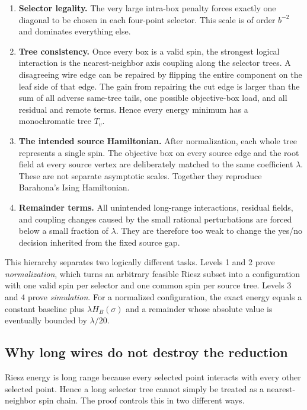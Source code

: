 \documentclass[12pt,a4paper]{article}
\begin{document}
\begin{enumerate}[label=\textbf{Level \arabic*.},leftmargin=3.2em]
\item \textbf{Selector legality.}  The very large intra-box penalty forces exactly one diagonal to be chosen in each four-point selector.  This scale is of order $b^{-2}$ and dominates everything else.

\item \textbf{Tree consistency.}  Once every box is a valid spin, the strongest logical interaction is the nearest-neighbor axis coupling along the selector trees.  A disagreeing wire edge can be repaired by flipping the entire component on the leaf side of that edge.  The gain from repairing the cut edge is larger than the sum of all adverse same-tree tails, one possible objective-box load, and all residual and remote terms.  Hence every energy minimum has a monochromatic tree $T_v$.

\item \textbf{The intended source Hamiltonian.}  After normalization, each whole tree represents a single spin.  The objective box on every source edge and the root field at every source vertex are deliberately matched to the same coefficient $\lambda$.  These are not separate asymptotic scales.  Together they reproduce Barahona's Ising Hamiltonian.

\item \textbf{Remainder terms.}  All unintended long-range interactions, residual fields, and coupling changes caused by the small rational perturbations are forced below a small fraction of $\lambda$.  They are therefore too weak to change the yes/no decision inherited from the fixed source gap.
\end{enumerate}

This hierarchy separates two logically different tasks.  Levels 1 and 2 prove \emph{normalization}, which turns an arbitrary feasible Riesz subset into a configuration with one valid spin per selector and one common spin per source tree.  Levels 3 and 4 prove \emph{simulation}.  For a normalized configuration, the exact energy equals a constant baseline plus $\lambda H_B(\sigma)$ and a remainder whose absolute value is eventually bounded by $\lambda/20$.

\subsection*{Why long wires do not destroy the reduction}

Riesz energy is long range because every selected point interacts with every other selected point.  Hence a long selector tree cannot simply be treated as a nearest-neighbor spin chain.  The proof controls this in two different ways.
\end{document}
